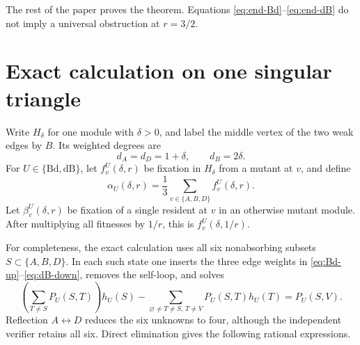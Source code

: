 \documentclass[11pt]{article}
\theoremstyle{definition}
\theoremstyle{remark}
\newcommand{\Bd}{\mathrm{Bd}}
\newcommand{\dB}{\mathrm{dB}}
\begin{document}
The rest of the paper proves the theorem.  Equations
\eqref{eq:end-Bd}--\eqref{eq:end-dB} do not imply a universal obstruction at
$r=3/2$.

\section{Exact calculation on one singular triangle}

Write $H_\delta$ for one module with $\delta>0$, and label the middle vertex
of the two weak edges by $B$.  Its weighted degrees are
\begin{equation}
 d_A=d_D=1+\delta,\qquad d_B=2\delta.
 \label{eq:triangle-degrees}
\end{equation}
For $U\in\{\Bd,\dB\}$, let $f_v^U(\delta,r)$ be fixation in $H_\delta$
from a mutant at $v$, and define
\[
 \alpha_U(\delta,r)=\frac13\sum_{v\in\{A,B,D\}}f_v^U(\delta,r).
\]
Let $\beta_v^U(\delta,r)$ be fixation of a single resident at $v$ in an
otherwise mutant module.  After multiplying all fitnesses by $1/r$, this is
$f_v^U(\delta,1/r)$.

For completeness, the exact calculation uses all six nonabsorbing subsets
$S\subset\{A,B,D\}$.  In each such state one inserts the three edge weights
in \eqref{eq:Bd-up}--\eqref{eq:dB-down}, removes the self-loop, and solves
\begin{equation}
 \left(\sum_{T\ne S}P_U(S,T)\right)h_U(S)
 -\sum_{\varnothing\ne T\ne S,\,T\ne V}P_U(S,T)h_U(T)
 =P_U(S,V).
 \label{eq:six-state-system}
\end{equation}
Reflection $A\leftrightarrow D$ reduces the six unknowns to four, although
the independent verifier retains all six.  Direct elimination gives the
following rational expressions.
\end{document}
